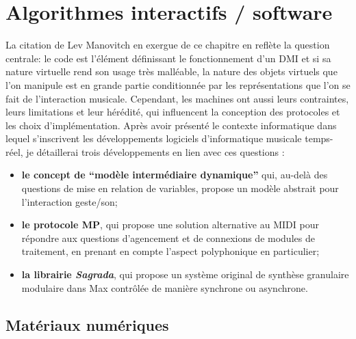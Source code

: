 %
\chapter{Algorithmes interactifs / software}
\label{ch:algorithms}


\vspace*{\fill}

\noindent La citation de Lev Manovitch en exergue de ce chapitre en reflète la question centrale: le code est l'élément définissant le fonctionnement d'un \gls{DMI} et si sa nature virtuelle rend son usage très malléable, la nature des objets virtuels que l'on manipule est en grande partie conditionnée par les représentations que l'on se fait de l'interaction musicale. Cependant, les machines ont aussi leurs contraintes, leurs limitations et leur hérédité, qui influencent la conception des protocoles et les choix d'implémentation. Après avoir présenté le contexte informatique dans lequel s'inscrivent les développements logiciels d'informatique musicale temps-réel, je détaillerai trois développements en lien avec ces questions :
\vspace{-1em}
\begin{itemize}[noitemsep]
	\item \textbf{le concept de ``modèle intermédiaire dynamique''} qui, au-delà des questions de mise en relation de variables, propose un modèle abstrait pour l'interaction geste/son;
	\item \textbf{le protocole MP}, qui propose une solution alternative au \gls{MIDI} pour répondre aux questions d'agencement et de connexions de modules de traitement, en prenant en compte l'aspect polyphonique en particulier;
	\item \textbf{la librairie \textit{Sagrada}}, qui propose un système original de synthèse granulaire modulaire dans Max contrôlée de manière synchrone ou asynchrone.
\end{itemize}

\clearpage

\section{Matériaux numériques}
\label{ch:algorithms:digital-material}

